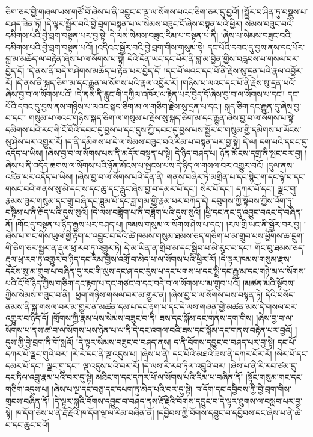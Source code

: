 ཅིག་ཅར་གྱི་གཞལ་ཡས་གཙོ་བོ་ཞེས་པ་ནི་འབྱུང་བ་ལྔ་ལ་སོགས་པའང་ཅིག་ཅར་དུ་བྱའོ། །སྦྱོར་བ་ཤིན་ཏུ་བསྡུས་པ་བཤད་ཟིན་ཏོ། །དེ་ལྟར་སྦྱོར་བའི་བྱེ་བྲག་བསྟན་པ་ལ་སེམས་བཟུང་ངོ་ཞེས་བསྟན་པའི་ཕྱིར། སེམས་བཟུང་བའི་དམིགས་པའི་བྱེ་བྲག་བསྟན་པར་བྱ་སྟེ། དེ་ལས་སེམས་བཟུང་རིམ་པ་བསྟན་པ་ནི། །ཞེས་པ་སེམས་བཟུང་བའི་དམིགས་པའི་བྱེ་བྲག་བསྟན་པའོ། །འདིའང་སྦྱོར་བའི་བྱེ་བྲག་གིས་གསུམ་སྟེ། དང་པོའི་དབང་དུ་བྱས་ནས་དང་པོར་བླ་མ་མཆོད་ལ་བརྟེན་ཞེས་པ་ལ་སོགས་པ་སྟེ། དེའི་དོན་ཡང་དང་པོར་ནི་བླ་མ་བྱིན་གྱིས་བརླབས་པ་གསལ་བར་བྱེད་དོ། །དེ་ནས་ནི་བདེ་གཤེགས་མཆོད་པ་རྟེན་པར་བྱེད་དོ། །དང་པོ་ལའང་དང་པོ་ནི་རྗེས་སུ་དྲན་པའི་རྣལ་འབྱོར་རོ། །དེ་ནས་ནི་སྐད་ཅིག་མ་དང་རྒྱུན་ལ་སོགས་པའི་རྣལ་འབྱོར་རོ། །གཉིས་པ་ལའང་དང་པོ་ནི་རྗེས་སུ་དྲན་པའོ་ཞེས་བྱ་བ་ལ་སོགས་པའོ། །དེ་ནས་ནི་རླུང་གི་དཀྱིལ་འཁོར་​ ལ་རྟེན་པར་བྱེད་དོ་ཞེས་བྱ་བ་ལ་སོགས་པ་དང་། དང་པོའི་དབང་དུ་བྱས་ནས་གཉིས་པ་ལའང་སྐད་ཅིག་མ་ལ་གཅིག་རྗེས་སུ་དྲན་པ་དང་། སྐད་ཅིག་དང་རྒྱུན་དུ་ཞེས་བྱ་བ་དང་། གསུམ་པ་ལའང་གཉིས་སྐད་ཅིག་ལ་གསུམ་པ་རྗེས་སུ་སྐད་ཅིག་མ་དང་རྒྱུན་ཞེས་བྱ་བ་ལ་སོགས་པ་སྟེ། དམིགས་པའི་རང་གི་ངོ་བོའི་དབང་དུ་བྱས་པ་དང་དུས་ཀྱི་དབང་དུ་བྱས་པས་སྦྱོར་བ་གསུམ་གྱི་དམིགས་པ་ཡོངས་སུ་ཤེས་པར་འགྱུར་རོ། །ད་ནི་དམིགས་པ་དེ་ལ་སེམས་བཟུང་བའི་རིམ་པ་བསྟན་པར་བྱ་སྟེ། དེ་ལ། དག་པའི་དབང་དུ་འདོད་པ་ཡིས། །ཞེས་བྱ་བ་ལ་སོགས་པས་ནི་མདོར་བསྟན་པ་སྟེ། དེ་ཉིད་བཤད་པ། ཉོན་མོངས་དགྲ་ནི་སྤང་བར་བྱ། །ཞེས་པ་ནི་འདོད་ཆགས་ལ་སོགས་པའི་ཉོན་མོངས་པ་སྤངས་པས་དེ་ཉིད་ལ་གསལ་བར་འགྱུར་བའོ། །དུལ་ནས་འཛིན་པར་འདོད་པ་ཡིས། །ཞེས་བྱ་བ་ལ་སོགས་པའི་དོན་ནི། གནས་བཞིར་ཏེ་མགྲིན་པ་དང་སྙིང་ག་དང་ལྟེ་བ་དང་གསང་བའི་གནས་སུ་མེ་དང་ས་དང་ཆུ་དང་རླུང་ཞེས་བྱ་བ་དམར་པོ་དང་། སེར་པོ་དང་། དཀར་པོ་དང་། ལྗང་གུ་རྣམས་ཟུར་གསུམ་དང་གྲུ་བཞི་དང་ཟླུམ་པོ་དང་ཟླ་གམ་གྱི་རྣམ་པར་བཀོད་དེ། དབུགས་ཀྱི་སྟོབས་ཀྱིས་འོག་ཏུ་བསྟིམ་པ་ནི་རྒོད་པའི་དུས་སུའོ། །དེ་ལས་བཟློག་པ་ནི་བཟློག་པའི་དུས་སུའོ། །ཕྱི་དང་ནང་དུ་འབྱུང་བའང་དེ་བཞིན་ནོ། །གོང་དུ་བསྟན་པ་ཉིད་རྒྱས་པར་བཤད་པ། ཁམས་གསུམ་ལ་སོགས་ཤེས་པ་དང་། །རལ་གྲི་ཡང་ནི་སྦྱོར་བར་བྱ། །ཞེས་པ་གང་གིས་ཡུལ་གྱི་རྟོག་པ་འབྱུང་བ་དེའི་ཚེ་ཁམས་གསུམ་ཐམས་ཅད་གཅིག་པ་མ་གྲུབ་པས་ཕྱོགས་ཆ་དྲུག་གི་ཅིག་ཅར་སྦྱར་ན་རྡུལ་ཕྲ་རབ་ཏུ་འགྱུར་ཏེ། དེ་མ་ཡིན་ན་གྲིབ་མ་དང་སྒྲིབ་པ་མི་རུང་བ་དང་། གོང་བུ་ཐམས་ཅད་རྡུལ་ཕྲ་རབ་ཏུ་འགྱུར་བ་ཉིད་དང་རིམ་གྱིས་འགྲོ་བ་མེད་པ་ལ་སོགས་པའི་ཕྱིར་རོ། །དེ་ལྟར་ཁམས་གསུམ་རྫས་དངོས་སུ་མ་གྲུབ་པ་བཞིན་དུ་རང་གི་ལུས་དང་ཤ་དང་རུས་པ་དང་པགས་པ་དང་སྤྲི་དང་རྒྱུ་མ་དང་གཉེ་མ་ལ་སོགས་པའི་ངོ་བོ་ཉིད་ཀྱིས་གཅིག་དང་རྟག་པ་དང་གཙང་བ་དང་བདེ་བ་ལ་སོགས་པ་མ་གྲུབ་པའོ། །མཚན་མའི་སྟོབས་ཀྱིས་སེམས་གཟུང་བ་ནི།  ​ ཕྱག་གཉིས་གསལ་བར་མ་གྱུར་ན། །ཞེས་བྱ་བ་ལ་སོགས་པས་བསྟན་ཏེ། དེའི་བསོད་ནམས་ནི་སྐུ་གསལ་བར་མ་གྱུར་ན་མཚན་དམ་པ་དང་རྟག་པ་དང་དེ་ལས་གཞན་གྱི་མཚན་མས་དེ་གསལ་བར་འགྱུར་བ་ཉིད་དོ། །གྲོགས་ཀྱི་རྣམ་པས་སེམས་བཟུང་བ་ནི། ཟས་དང་སྐོམ་དང་གནས་དག་གིས། །ཞེས་བྱ་བ་ལ་སོགས་པ་ནས་ཚ་བ་ལ་སོགས་པས་ཉེན་པ་ལ་ནི་དེ་དང་འགལ་བའི་ཟས་དང་སྐོམ་དང་གནས་བརྟེན་པར་བྱའོ། །དུས་ཀྱི་བྱེ་བྲག་ནི་གོ་སླའོ། །དེ་ལྟར་སེམས་བཟུང་བ་བཤད་ནས། ད་ནི་བོགས་དབྱུང་བ་བཤད་པར་བྱ་སྟེ། དང་པོ་དཀར་པོ་ལྗང་གུའི་བར། །རེ་རེ་དང་ནི་ལྔ་འདུས་པ། །ཞེས་པ་ནི། དང་པོའི་མཐའི་ཟས་ནི་དཀར་པོར་རོ། །སེར་པོ་དང་དམར་པོ་དང་། ལྗང་གུ་དང་། ལྔ་འདུས་པའི་བར་རོ། །དེ་ལས་རི་རབ་ཏིལ་འབྲུའི་བར། །ཞེས་པ་ནི་རི་རབ་ཙམ་དུ་དང་ཏིལ་འབྲུ་རྣམ་པའི་བར་དུ་སྟེ། མཐིང་ག་དང་དཀར་པོ་ལ་སོགས་པའི་རིམ་པ་བཞིན་ནོ། །སྟོང་གསུམ་གང་དང་གཅིག་འདུས་པ། །ཞེས་པ་ལྔ་དང་བཅུ་དང་དཔག་ཏུ་མེད་པའི་བར་དུ་སྟེ། ཁ་དོག་དང་དབྱིབས་ཀྱི་བྱེ་བྲག་གིས་གྲངས་བཞིན་ནོ། །དེ་ལྟར་སྐུའི་བོགས་དབྱུང་བ་བཤད་ནས་རྡོ་རྗེའི་བོགས་དབྱུང་བ་དེ་ལྟར་ཐུགས་ལ་བསླབ་པར་བྱ་སྟེ། ཁ་དོག་ཅེས་པ་ནི་རྡོ་རྗེའི་ཁ་དོག་ལྔ་ལ་རིམ་བཞིན་ནོ། །དབྱིབས་ཀྱི་བོགས་དབྱུང་བ་དབྱིབས་དང་ཞེས་པ་ནི་ཆེ་བ་དང་ཆུང་བའོ། 